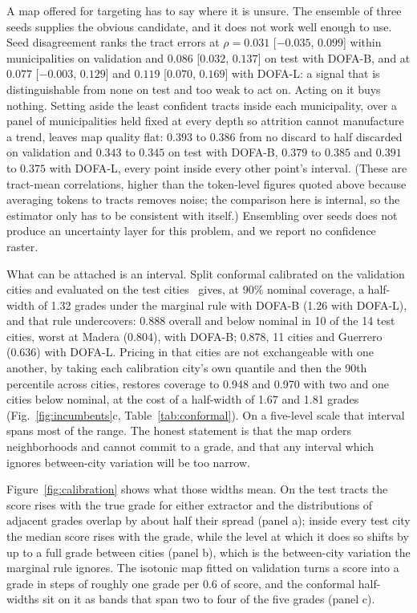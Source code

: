 \documentclass[11pt]{article}
\begin{document}
A map offered for targeting has to say where it is unsure. The ensemble of three seeds
supplies the obvious candidate, and it does not work well enough to use. Seed
disagreement ranks the tract errors at $\rho = 0.031$ [$-0.035$, $0.099$] within
municipalities on validation and $0.086$ [$0.032$, $0.137$] on test with DOFA-B, and at
$0.077$ [$-0.003$, $0.129$] and $0.119$ [$0.070$, $0.169$] with DOFA-L: a signal that is
distinguishable from none on test and too weak to act on. Acting on it buys nothing.
Setting aside the least confident tracts inside each municipality, over a panel of
municipalities held fixed at every depth so attrition cannot manufacture a trend,
leaves map quality flat: $0.393$ to $0.386$ from no discard to half discarded on
validation and $0.343$ to $0.345$ on test with DOFA-B, $0.379$ to $0.385$ and $0.391$
to $0.375$ with DOFA-L, every point inside every other point's interval. (These are
tract-mean correlations, higher than the token-level figures quoted above because
averaging tokens to tracts removes noise; the comparison here is internal, so the
estimator only has to be consistent with itself.) Ensembling over seeds does not
produce an uncertainty layer for this problem, and we report no confidence raster.

What can be attached is an interval. Split conformal calibrated on the validation cities
and evaluated on the test cities~\cite{vovk2005} gives, at 90\% nominal coverage, a
half-width of 1.32 grades under the marginal rule with DOFA-B (1.26 with DOFA-L), and
that rule undercovers: 0.888 overall and below nominal in 10 of the 14 test cities,
worst at Madera (0.804), with DOFA-B; 0.878, 11 cities and Guerrero (0.636) with
DOFA-L. Pricing in that cities are not exchangeable with one another, by taking each
calibration city's own quantile and then the 90th percentile across cities, restores
coverage to 0.948 and 0.970 with two and one cities below nominal, at the cost of a
half-width of 1.67 and 1.81 grades (Fig.~\ref{fig:incumbents}c,
Table~\ref{tab:conformal}). On a five-level scale that interval spans most of the
range. The honest statement is that the map orders neighborhoods and cannot commit to
a grade, and that any interval which ignores between-city variation will be too narrow.



Figure~\ref{fig:calibration} shows what those widths mean. On the test tracts the score
rises with the true grade for either extractor and the distributions of adjacent grades
overlap by about half their spread (panel a); inside every test city the median score
rises with the grade, while the level at which it does so shifts by up to a full grade
between cities (panel b), which is the between-city variation the marginal rule
ignores. The isotonic map fitted on validation turns a score into a grade in steps of
roughly one grade per $0.6$ of score, and the conformal half-widths sit on it as bands
that span two to four of the five grades (panel c).
\end{document}
